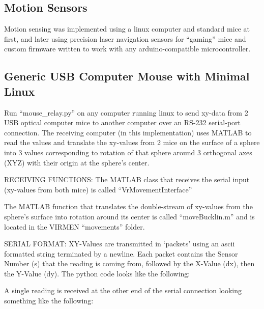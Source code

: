 \subsection{Motion Sensors}\label{motion-sensors}

Motion sensing was implemented using a linux computer and standard mice
at first, and later using precision laser navigation sensors for
``gaming'' mice and custom firmware written to work with any
arduino-compatible microcontroller.

\subsection{Generic USB Computer Mouse with Minimal
Linux}\label{generic-usb-computer-mouse-with-minimal-linux}

Run ``mouse\_relay.py'' on any computer running linux to send xy-data
from 2 USB optical computer mice to another computer over an RS-232
serial-port connection. The receiving computer (in this implementation)
uses MATLAB to read the values and translate the xy-values from 2 mice
on the surface of a sphere into 3 values corresponding to rotation of
that sphere around 3 orthogonal axes (XYZ) with their origin at the
sphere's center.

RECEIVING FUNCTIONS: The MATLAB class that receives the serial input
(xy-values from both mice) is called ``VrMovementInterface''

The MATLAB function that translates the double-stream of xy-values from
the sphere's surface into rotation around its center is called
``moveBucklin.m'' and is located in the VIRMEN ``movements'' folder.

SERIAL FORMAT: XY-Values are transmitted in `packets' using an ascii
formatted string terminated by a newline. Each packet contains the
Sensor Number (s) that the reading is coming from, followed by the
X-Value (dx), then the Y-Value (dy). The python code looks like the
following:


A single reading is received at the other end of the serial connection
looking something like the following:

